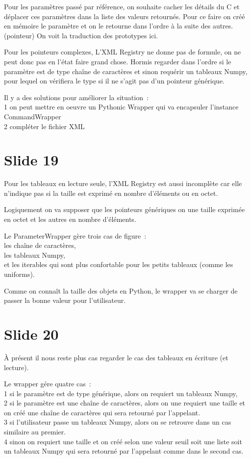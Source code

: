 \documentclass[12pt]{article}
\begin{document}
Pour les paramètres passé par référence, on souhaite cacher les détails du C et déplacer ces
paramètres dans la liste des valeurs retournés. Pour ce faire on créé en mémoire le paramètre et on
le retourne dans l'ordre à la suite des autres. (pointeur) On voit la traduction des prototypes ici.

Pour les pointeurs complexes, L'XML Registry ne donne pas de formule, on ne peut donc pas en l'état
faire grand chose. Hormis regarder dans l'ordre si le paramètre est de type chaîne de caractères et
sinon requérir un tableaux Numpy, pour lequel on vérifiera le type si il ne s'agit pas d'un pointeur
générique.

Il y a des solutions pour améliorer la situation~: \\
 1 on peut mettre en oeuvre un Pythonic Wrapper qui va encapsuler l'instance CommandWrapper \\
 2 compléter le fichier XML

\section{Slide 19}

Pour les tableaux en lecture seule, l'XML Registry est aussi incomplète car elle n'indique pas si la
taille est exprimé en nombre d'éléments ou en octet.

Logiquement on va supposer que les pointeurs génériques on une taille exprimée en octet et les
autres en nombre d'éléments.

Le ParameterWrapper gère trois cas de figure~: \\
  les chaîne de caractères, \\
  les tableaux Numpy, \\
  et les iterables qui sont plus confortable pour les petits tableaux (comme les uniforms).

Comme on connaît la taille des objets en Python, le wrapper va se charger de passer la bonne valeur
pour l'utilisateur.

\section{Slide 20}

À présent il nous reste plus cas regarder le cas des tableaux en écriture (et lecture).

Le wrapper gére quatre cas~: \\
 1 si le paramètre est de type générique, alors on requiert un tableaux Numpy, \\
 2 si le paramètre est une chaîne de caractères, alors on une requiert une taille et on créé une
 chaîne de caractères qui sera retourné par l'appelant. \\
 3 si l'utilisateur passe un tableaux Numpy, alors on se retrouve dans un cas similaire au premier. \\
 4 sinon on requiert une taille et on créé selon une valeur seuil soit une liste soit un tableaux
 Numpy qui sera retourné par l'appelant comme dans le second cas.  
\end{document}
